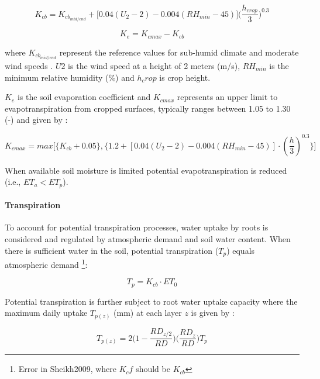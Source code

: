 \documentclass[]{article}
\let\oldparagraph\paragraph
\renewcommand{\paragraph}[1]{\oldparagraph{#1}\mbox{}}
\let\rmarkdownfootnote\footnote%
\def\footnote{\protect\rmarkdownfootnote}
\begin{document}
\begin{equation}
K_{cb}=K_{cb_{mid/end}} + \Big[ 0.04(U_2-2)-0.004(RH_{min}-45) \Big] \Big( \frac{h_{crop}}{3} \Big) ^{0.3}
\label{eq:Kcb}  
\end{equation}

\begin{equation}
K_e= K_{cmax}-K_{cb}
\label{eq:Ke}  
\end{equation}

where \(K_{cb_{mid/end}}\) represent the reference values for sub-humid
climate and moderate wind speeds \citep[see][]{Allen1998}. \(U2\) is the
wind speed at a height of 2 meters (m/s), \(RH_{min}\) is the minimum
relative humidity (\%) and \(h_crop\) is crop height.

\(K_e\) is the soil evaporation coefficient and \(K_{cmax}\) represents
an upper limit to evapotranspiration from cropped surfaces, typically
ranges between 1.05 to 1.30 (-) and given by \citep{Sheikh2009}:

\begin{equation}
K_{cmax}=max \Big[ \Big\{ K_{cb}+0.05 \Big\} , \Big\{ 1.2 + [0.04(U_2-2)-0.004(RH_{min}-45)] \cdot (\frac{h}{3})^{0.3} \Big\} \Big]
\label{eq:Kcmax}  
\end{equation}

When available soil moisture is limited potential evapotranspiration is
reduced (i.e., \(ET_a < ET_p\)).

\hypertarget{transpiration}{%
\paragraph{Transpiration}\label{transpiration}}

To account for potential transpiration processes, water uptake by roots
is considered and regulated by atmospheric demand and soil water
content. When there is sufficient water in the soil, potential
transpiration (\(T_p\)) equals atmospheric demand
\citep{Sheikh2009}\footnote{Error in Sheikh2009, where $K_{c}f$ should be $K_{cb}$}:

\begin{equation}
T_p=K_{cb} \cdot ET_0
\label{eq:Tp}  
\end{equation}

Potential transpiration is further subject to root water uptake capacity
where the maximum daily uptake \(T_{p(z)}\) (mm) at each layer \(z\) is
given by \citep{Prasad1988}:

\begin{equation}
T_{p(z)} = 2 \Big( 1- \frac{RD_{z/2} }{RD} \Big) \Big( \frac{RD_z}{RD} \Big) T_p
\label{eq:Tpz}  
\end{equation}
\end{document}
